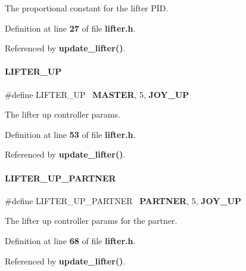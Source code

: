 The proportional constant for the lifter P\+ID. 



Definition at line \textbf{ 27} of file \textbf{ lifter.\+h}.



Referenced by \textbf{ update\+\_\+lifter()}.

\mbox{\label{lifter_8h_a96a5c0bbb7527bf1d45818fc4db97b68}} 
\paragraph{L\+I\+F\+T\+E\+R\+\_\+\+UP}
{\footnotesize\ttfamily \#define L\+I\+F\+T\+E\+R\+\_\+\+UP~\textbf{ M\+A\+S\+T\+ER}, 5, \textbf{ J\+O\+Y\+\_\+\+UP}}



The lifter up controller params. 



Definition at line \textbf{ 53} of file \textbf{ lifter.\+h}.



Referenced by \textbf{ update\+\_\+lifter()}.

\mbox{\label{lifter_8h_adbb0a4048f612d2042be2b1d2644a16e}} 
\paragraph{L\+I\+F\+T\+E\+R\+\_\+\+U\+P\+\_\+\+P\+A\+R\+T\+N\+ER}
{\footnotesize\ttfamily \#define L\+I\+F\+T\+E\+R\+\_\+\+U\+P\+\_\+\+P\+A\+R\+T\+N\+ER~\textbf{ P\+A\+R\+T\+N\+ER}, 5, \textbf{ J\+O\+Y\+\_\+\+UP}}



The lifter up controller params for the partner. 



Definition at line \textbf{ 68} of file \textbf{ lifter.\+h}.



Referenced by \textbf{ update\+\_\+lifter()}.

\mbox{\label{lifter_8h_a4679d8ea8690999a6c6c7c0cb245c879}} 
